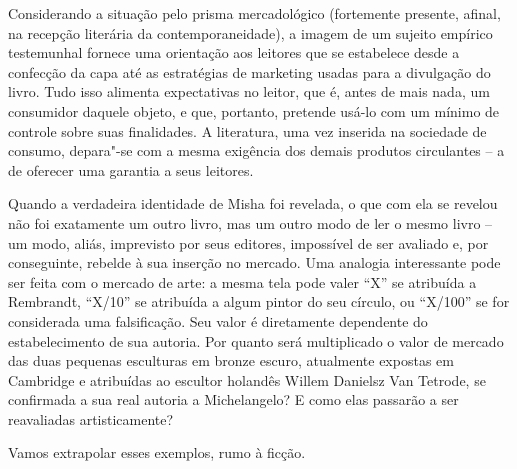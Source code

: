 Considerando a situação pelo prisma mercadológico (fortemente presente,
afinal, na recepção literária da contemporaneidade), a imagem de um
sujeito empírico testemunhal fornece uma orientação aos leitores que se
estabelece desde a confecção da capa até as estratégias de marketing
usadas para a divulgação do livro. Tudo isso alimenta expectativas no
leitor, que é, antes de mais nada, um consumidor daquele objeto, e que,
portanto, pretende usá-lo com um mínimo de controle sobre suas
finalidades. A literatura, uma vez inserida na sociedade de consumo,
depara"-se com a mesma exigência dos demais produtos circulantes -- a de
oferecer uma garantia a seus leitores.

Quando a verdadeira identidade de Misha foi revelada, o que com ela se
revelou não foi exatamente um outro livro, mas um outro modo de ler o
mesmo livro -- um modo, aliás, imprevisto por seus editores, impossível
de ser avaliado e, por conseguinte, rebelde à sua inserção no mercado.
Uma analogia interessante pode ser feita com o mercado de arte: a mesma
tela pode valer ``X'' se atribuída a Rembrandt, ``X/10'' se atribuída a
algum pintor do seu círculo, ou ``X/100'' se for considerada uma
falsificação. Seu valor é diretamente dependente do estabelecimento de
sua autoria. Por quanto será multiplicado o valor de mercado das duas
pequenas esculturas em bronze escuro, atualmente expostas em Cambridge e
atribuídas ao escultor holandês Willem Danielsz Van Tetrode, se
confirmada a sua real autoria a Michelangelo? E como elas passarão a ser
reavaliadas artisticamente?

Vamos extrapolar esses exemplos, rumo à ficção.

